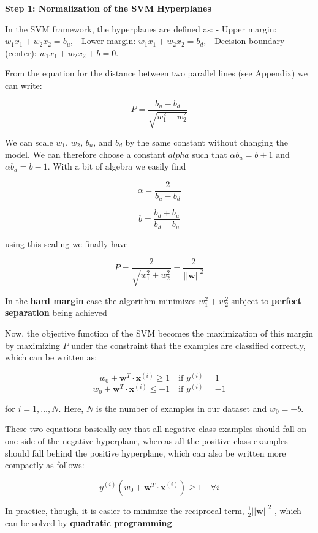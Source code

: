 \documentclass[11pt]{article}
\begin{document}
\textbf{Step 1: Normalization of the SVM Hyperplanes}

In the SVM framework, the hyperplanes are defined as: - Upper margin:
$w_1 x_1 + w_2 x_2 = b_u $, - Lower margin: $w_1 x_1 + w_2
x_2 = b_d $, - Decision boundary (center): $ w_1 x_1 + w_2 x_2 +
b = 0 $.

    

    From the equation for the distance between two parallel lines (see
Appendix) we can write:

$$P = \frac{b_u - b_d}{\sqrt{w_1^2+w_2^2}}$$

We can scale $w_1$, $w_2$, $b_u$, and $b_d$ by the same constant
without changing the model. We can therefore choose a constant $alpha$
such that $\alpha b_u=b+1$ and $\alpha b_d=b-1$. With a bit of
algebra we easily find

$$
\alpha = \frac{2}{b_u-b_d}
$$

$$
b = \frac{b_d+b_u}{b_d-b_u}
$$

using this scaling we finally have

$$P = \frac{2}{\sqrt{w_1^2+w_2^2}} = \frac{2}{\vert\vert \mathbf{w} \vert\vert^2}$$

    In the \textbf{hard margin} case the algorithm minimizes $w_1^2+w_2^2$
subject to \textbf{perfect separation} being achieved

Now, the objective function of the SVM becomes the maximization of this
margin by maximizing $P$ under the constraint that the examples are
classified correctly, which can be written as:

$$w_0 + \mathbf{w}^T \cdot \mathbf{x}^{(i)} \ge 1 \quad \text{if } y^{(i)} = 1$$
$$w_0 + \mathbf{w}^T \cdot \mathbf{x}^{(i)} \le -1 \quad \text{if } y^{(i)} = -1$$

for $i = 1, \dots, N$. Here, $N$ is the number of examples in our dataset and $w_0 = -b$.

These two equations basically say that all negative-class examples
should fall on one side of the negative hyperplane, whereas all the
positive-class examples should fall behind the positive hyperplane,
which can also be written more compactly as follows:

\begin{equation}
y^{(i)}\left(w_0 + \mathbf{w}^T \cdot \mathbf{x}^{(i)}\right) \ge 1 \quad \forall i
\end{equation}

In practice, though, it is easier to minimize the reciprocal term,
$\frac{1}{2}\vert\vert\mathbf{w}\vert\vert^2$ , which can be solved by
\textbf{quadratic programming}.
\end{document}
